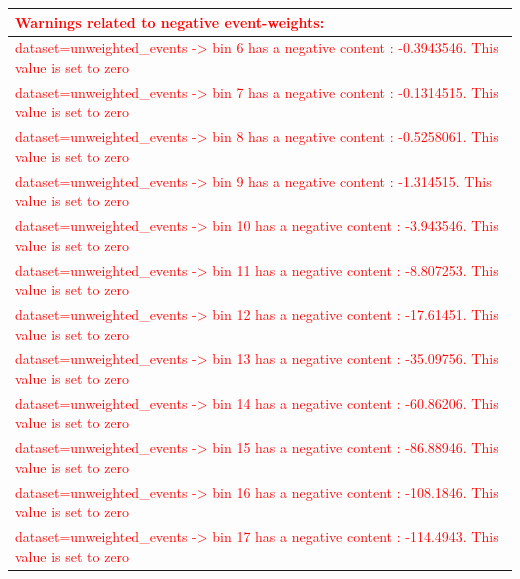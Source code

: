 \documentclass[a4paper, 10pt]{article}
\begin{document}
\begin{table}[H]
  \begin{center}
    \begin{tabular}{|m{140.0mm}|}
      \hline
      {\cellcolor{white}\textcolor{red}{Warnings related to negative event-weights:}}\\
      \hline
      {\cellcolor{white}\textcolor{red}{dataset=unweighted\_events -> bin 6 has a negative content : -0.3943546. This value is set to zero}}\\
      \hline
      {\cellcolor{white}\textcolor{red}{dataset=unweighted\_events -> bin 7 has a negative content : -0.1314515. This value is set to zero}}\\
      \hline
      {\cellcolor{white}\textcolor{red}{dataset=unweighted\_events -> bin 8 has a negative content : -0.5258061. This value is set to zero}}\\
      \hline
      {\cellcolor{white}\textcolor{red}{dataset=unweighted\_events -> bin 9 has a negative content : -1.314515. This value is set to zero}}\\
      \hline
      {\cellcolor{white}\textcolor{red}{dataset=unweighted\_events -> bin 10 has a negative content : -3.943546. This value is set to zero}}\\
      \hline
      {\cellcolor{white}\textcolor{red}{dataset=unweighted\_events -> bin 11 has a negative content : -8.807253. This value is set to zero}}\\
      \hline
      {\cellcolor{white}\textcolor{red}{dataset=unweighted\_events -> bin 12 has a negative content : -17.61451. This value is set to zero}}\\
      \hline
      {\cellcolor{white}\textcolor{red}{dataset=unweighted\_events -> bin 13 has a negative content : -35.09756. This value is set to zero}}\\
      \hline
      {\cellcolor{white}\textcolor{red}{dataset=unweighted\_events -> bin 14 has a negative content : -60.86206. This value is set to zero}}\\
      \hline
      {\cellcolor{white}\textcolor{red}{dataset=unweighted\_events -> bin 15 has a negative content : -86.88946. This value is set to zero}}\\
      \hline
      {\cellcolor{white}\textcolor{red}{dataset=unweighted\_events -> bin 16 has a negative content : -108.1846. This value is set to zero}}\\
      \hline
      {\cellcolor{white}\textcolor{red}{dataset=unweighted\_events -> bin 17 has a negative content : -114.4943. This value is set to zero}}\\

\end{tabular}
\end{center}
\end{table}
\end{document}

